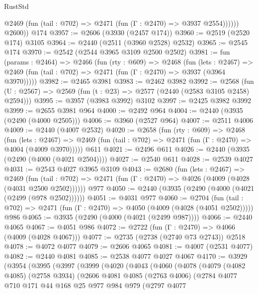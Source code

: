 \begin{lexlean}{RustStd}
\begin{coremodule}
{\begin{coremodule}
{{{{{{{{{{{{              @2469 (fun (tail : @702) => @2471 (fun (Γ : @2470) => @3937 @2554))))))
        @2600))
    @174
@3957 := @2606 (@3930 (@2457 @174))
@3960 := @2519 (@2520 @174) @3105
@3964 := @2440 (@2511 (@3960 @2528) @2532)
@3965 := @2545 @174
@3970 := @2542 (@2544 @3965 @3109 @2500 @2502)
@3981 := fun (params : @2464) =>
  @2466
    (fun (rty : @609) =>
    @2468
      (fun (lets : @2467) =>
      @2469 (fun (tail : @702) => @2471 (fun (Γ : @2470) => @3937 (@3964 @3970)))))
@3982 := @2465 @3981
@3983 := @2462 @3982
@3992 := @2568 (fun (U : @2567) => @2569 (fun (t : @23) => @2577 (@2440 (@2583 @3105 @2458) @2594)))
@3995 := @3957 (@3983 @3992) @3102
@3997 := @2425 @3982 @3992
@3999 := @2655 @3981 @964
@4000 := @2492 @964
@4004 := @2440 (@3935 (@2490 (@4000 @2505)))
@4006 := @3960 (@2527 @964)
@4007 := @2511 @4006
@4009 := @2440 (@4007 @2532)
@4020 := @2658
    (fun (rty : @609) =>
    @2468
      (fun (lets : @2467) =>
      @2469 (fun (tail : @702) => @2471 (fun (Γ : @2470) => @4004 (@4009 @3970)))))
    @611
@4021 := @2496 @611
@4026 := @2440 (@3935 (@2490 (@4000 (@4021 @2504))))
@4027 := @2540 @611
@4028 := @2539 @4027
@4031 := @2543 @4027 @3965 @3109
@4043 := @2680
    (fun (lets : @2467) =>
    @2469
      (fun (tail : @702) => @2471 (fun (Γ : @2470) => @4026 (@4009 (@4028 (@4031 @2500 @2502))))))
    @977
@4050 := @2440 (@3935 (@2490 (@4000 (@4021 (@2499 (@978 @2502))))))
@4051 := @4031 @977
@4060 := @2704
    (fun (tail : @702) => @2471 (fun (Γ : @2470) => @4050 (@4009 (@4028 (@4051 @2502)))))
    @986
@4065 := @3935 (@2490 (@4000 (@4021 (@2499 @987))))
@4066 := @2440 @4065
@4067 := @4051 @986
@4072 := @2722 (fun (Γ : @2470) => @4066 (@4009 (@4028 @4067)))
@4077 := @2735 (@2738 (@2740 @73 @2743)) @2518
@4078 := @4072 @4077
@4079 := @2606 @4065
@4081 := @4007 (@2531 @4077)
@4082 := @2440 @4081
@4085 := @2538 @4077 @4027 @4067
@4170 := @3929
    (@3954
      (@3995
        (@3997
          (@3999
            (@4020
              (@4043
                (@4060
                  (@4078
                    (@4079
                      (@4082 @4085)
                      (@2758 @3934)
                      (@2606
                        @4081
                        @4085
                        (@2763 @4006)
                        (@2784
                          @4077
                          @710
                          @171
                          @44
                          @168
                          @25
                          @977
                          @984
                          @979
                          (@2797
                            @4077
}}}}}}}}}}}}
\end{coremodule}}
\end{coremodule}
\end{lexlean}
